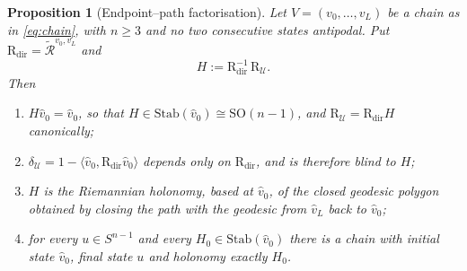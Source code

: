 \documentclass{article}
\theoremstyle{plain}
\newtheorem{proposition}[theorem]{Proposition}
\theoremstyle{definition}
\numberwithin{equation}{section}
\newcommand{\SO}{\mathrm{SO}}
\newcommand{\Stab}{\mathrm{Stab}}
\newcommand{\Rmin}{\widetilde{\mathcal{R}}}
\newcommand{\Uc}{\mathcal{U}}
\begin{document}
\begin{proposition}[Endpoint--path factorisation]\label{prop:holonomy}
Let $V = (v_0,\dots,v_L)$ be a chain as in \eqref{eq:chain}, with
$n \ge 3$ and no two consecutive states antipodal. Put
$\mathrm{R}_{\mathrm{dir}} = \Rmin^{v_0,v_L}$ and
\begin{equation}\label{eq:holdef}
H := \mathrm{R}_{\mathrm{dir}}^{-1}\,\mathrm{R}_\Uc .
\end{equation}
Then
\begin{enumerate}
\item[(i)] $H\hat{v}_0 = \hat{v}_0$, so that
$H \in \Stab(\hat{v}_0) \cong \SO(n-1)$, and
$\mathrm{R}_\Uc = \mathrm{R}_{\mathrm{dir}}H$ canonically;
\item[(ii)] $\delta_\Uc = 1 - \langle \hat{v}_0,
\mathrm{R}_{\mathrm{dir}}\hat{v}_0\rangle$ depends only on
$\mathrm{R}_{\mathrm{dir}}$, and is therefore blind to $H$;
\item[(iii)] $H$ is the Riemannian holonomy, based at $\hat{v}_0$, of
the closed geodesic polygon obtained by closing the path with the
geodesic from $\hat{v}_L$ back to $\hat{v}_0$;
\item[(iv)] for every $u \in S^{n-1}$ and every
$H_0 \in \Stab(\hat{v}_0)$ there is a chain with initial state
$\hat{v}_0$, final state $u$ and holonomy exactly $H_0$.
\end{enumerate}
\end{proposition}
\end{document}
